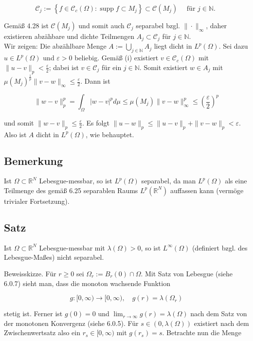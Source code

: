 \documentclass[10pt, letterpaper]{article}
\begin{document}
$$
\mathcal{C}_{j}:=\left\{f \in \mathcal{C}_{c}(\Omega): \operatorname{supp} f \subset M_{j}\right\} \subset \mathcal{C}\left(M_{j}\right) \quad \text { für } j \in \mathbb{N} \text {. }
$$

Gemäß 4.28 ist $\mathcal{C}\left(M_{j}\right)$ und somit auch $\mathcal{C}_{j}$ separabel bzgl. $\|\cdot\|_{\infty}$, daher existieren abzähbare und dichte Teilmengen $A_{j} \subset \mathcal{C}_{j}$ für $j \in \mathbb{N}$.\\
Wir zeigen: Die abzählbare Menge $A:=\bigcup_{j \in \mathbb{N}} A_{j}$ liegt dicht in $L^{p}(\Omega)$. Sei dazu $u \in L^{p}(\Omega)$ und $\varepsilon>0$ beliebig. Gemäß (i) existiert $v \in \mathcal{C}_{c}(\Omega)$ mit $\|u-v\|_{p}<\frac{\varepsilon}{2}$; dabei ist $v \in \mathcal{C}_{j}$ für ein $j \in \mathbb{N}$. Somit existiert $w \in A_{j}$ mit $\mu\left(M_{j}\right)^{\frac{1}{p}}\|v-w\|_{\infty} \leq \frac{\varepsilon}{2}$. Dann ist

$$
\|w-v\|_{p}^{p}=\int_{\Omega}|w-v|^{p} d \mu \leq \mu\left(M_{j}\right)\|v-w\|_{\infty}^{p} \leq\left(\frac{\varepsilon}{2}\right)^{p}
$$

und somit $\|w-v\|_{p} \leq \frac{\varepsilon}{2}$. Es folgt $\|u-w\|_{p} \leq\|u-v\|_{p}+\|v-w\|_{p}<\varepsilon$. Also ist $A$ dicht in $L^{p}(\Omega)$, wie behauptet.

\subsection*{Bemerkung}
Ist $\Omega \subset \mathbb{R}^{N}$ Lebesgue-messbar, so ist $L^{p}(\Omega)$ separabel, da man $L^{p}(\Omega)$ als eine Teilmenge des gemäß 6.25 separablen Raums $L^{p}\left(\mathbb{R}^{N}\right)$ auffassen kann (vermöge trivialer Fortsetzung).

\subsection*{Satz}
Ist $\Omega \subset \mathbb{R}^{N}$ Lebesgue-messbar mit $\lambda(\Omega)>0$, so ist $L^{\infty}(\Omega)$ (definiert bzgl. des Lebesgue-Maßes) nicht separabel.

Beweisskizze. Für $r \geq 0$ sei $\Omega_{r}:=B_{r}(0) \cap \Omega$. Mit Satz von Lebesgue (siehe 6.0.7) sieht man, dass die monoton wachsende Funktion

$$
g:[0, \infty) \rightarrow[0, \infty), \quad g(r)=\lambda\left(\Omega_{r}\right)
$$

stetig ist. Ferner ist $g(0)=0$ und $\lim _{r \rightarrow \infty} g(r)=\lambda(\Omega)$ nach dem Satz von der monotonen Konvergenz (siehe 6.0.5). Für $s \in(0, \lambda(\Omega))$ existiert nach dem Zwischenwertsatz also ein $r_{s} \in[0, \infty)$ mit $g\left(r_{s}\right)=s$. Betrachte nun die Menge
\end{document}
